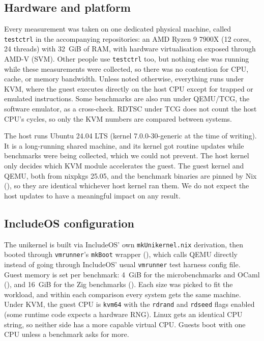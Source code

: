 \documentclass[12pt]{report}
\newcommand{\fullref}[1]{\Cref{#1}}
\renewcommand{\_}{\origunderscore\allowbreak}
\begin{document}
\subsection{Hardware and platform}

Every measurement was taken on one dedicated physical machine, called \texttt{testctrl} in the accompanying repositories: an AMD Ryzen 9 7900X (12 cores, 24 threads) with 32~GiB of RAM, with hardware virtualisation exposed through AMD-V (SVM). Other people use \texttt{testctrl} too, but nothing else was running while these measurements were collected, so there was no contention for CPU, cache, or memory bandwidth. Unless noted otherwise, everything runs under KVM, where the guest executes directly on the host CPU except for trapped or emulated instructions. Some benchmarks are also run under QEMU/TCG, the software emulator, as a cross-check. RDTSC under TCG does not count the host CPU's cycles, so only the KVM numbers are compared between systems.

The host runs Ubuntu 24.04 LTS (kernel 7.0.0-30-generic at the time of writing). It is a long-running shared machine, and its kernel got routine updates while benchmarks were being collected, which we could not prevent. The host kernel only decides which KVM module accelerates the guest. The guest kernel and QEMU, both from nixpkgs 25.05, and the benchmark binaries are pinned by Nix (\fullref{sec:nix-flakes}), so they are identical whichever host kernel ran them. We do not expect the host updates to have a meaningful impact on any result.

\subsection{IncludeOS configuration}

The unikernel is built via IncludeOS' own \texttt{mkUnikernel.nix} derivation, then booted through \texttt{vmrunner}'s \texttt{mkBoot} wrapper (), which calls QEMU directly instead of going through IncludeOS' usual \texttt{vmrunner} test harness config file. Guest memory is set per benchmark: 4~GiB for the microbenchmarks and OCaml (), and 16~GiB for the Zig benchmarks (). Each size was picked to fit the workload, and within each comparison every system gets the same machine. Under KVM, the guest CPU is \texttt{kvm64} with the \texttt{rdrand} and \texttt{rdseed} flags enabled (some runtime code expects a hardware RNG). Linux gets an identical CPU string, so neither side has a more capable virtual CPU. Guests boot with one CPU unless a benchmark asks for more.
\end{document}
